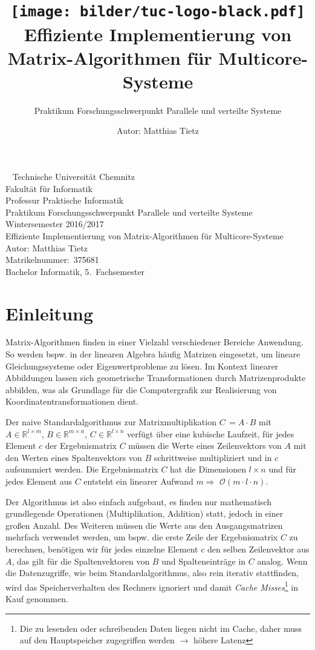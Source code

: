 \documentclass[a4paper,11pt]{scrartcl}
\title{\texttt{[image: bilder/tuc-logo-black.pdf]}
\\Effiziente Implementierung von Matrix-Algorithmen für Multicore-Systeme
}
\subtitle{Praktikum Forschungsschwerpunkt Parallele und verteilte Systeme}
\author{Autor: Matthias Tietz}
\newcommand{\bspw}{\mbox{bspw.}\xspace}
\begin{document}
\maketitle \thispagestyle{empty}

\newpage
\thispagestyle{empty}
~
\vfill
Technische Universität Chemnitz\\
Fakultät für Informatik\\
Professur Praktische Informatik\\
Praktikum Forschungsschwerpunkt Parallele und verteilte Systeme\\
Wintersemester 2016/2017\\

Effiziente Implementierung von Matrix-Algorithmen für Multicore-Systeme\\
Autor: Matthias Tietz\\
Matrikelnummer:~375681\\
Bachelor Informatik, 5.~Fachsemester

\newpage \tableofcontents
\newpage

\section{Einleitung}\label{chp:Einleitung}
Matrix-Algorithmen finden in einer Vielzahl verschiedener Bereiche Anwendung.
So werden \bspw in der linearen Algebra häufig Matrizen eingesetzt, um lineare Gleichungssysteme oder Eigenwertprobleme zu lösen. Im Kontext linearer Abbildungen lassen sich geometrische Transformationen
durch Matrizenprodukte abbilden, was als Grundlage für die Computergrafik zur Realisierung von Koordinatentransformationen dient.\newline

Der naive Standardalgorithmus zur Matrixmultiplikation 
$C\,= A \cdot B$ mit $A \in \mathbb{R}^{l \times m}$, $B \in \mathbb{R}^{m \times n}$,
$C \in \mathbb{R}^{l \times n}$ verfügt über eine kubische Laufzeit, für jedes Element $c$ der 
Ergebnismatrix $C$ müssen die Werte eines Zeilenvektors von $A$ mit den Werten eines Spaltenvektors
von $B$ schrittweise multipliziert und in $c$ aufsummiert werden. Die Ergebnismatrix $C$
hat die Dimensionen $l \times n$ und für jedes Element aus $C$ entsteht ein linearer Aufwand
$m \Rightarrow$ $\mathcal{O}(m \cdot l \cdot n)$.\newline

Der Algorithmus ist also einfach aufgebaut, es finden nur mathematisch grundlegende Operationen
(Multiplikation, Addition) statt, jedoch in einer großen Anzahl. 
Des Weiteren müssen die Werte aus den Ausgangsmatrizen mehrfach verwendet werden, um \bspw die erste Zeile der Ergebnismatrix $C$ zu berechnen,
benötigen wir für jedes einzelne Element $c$ den selben Zeilenvektor aus $A$, das gilt für die
Spaltenvektoren von $B$ und Spalteneinträge in $C$ analog.
Wenn die Datenzugriffe, wie beim Standardalgorithmus, also rein iterativ stattfinden,
wird das Speicherverhalten des Rechners ignoriert und damit \emph{Cache Misses}\footnote{Die zu 
lesenden oder schreibenden Daten liegen nicht im Cache, daher muss auf den Hauptspeicher 
zugegriffen werden $\rightarrow$ höhere Latenz} in Kauf genommen. \newline
\end{document}
